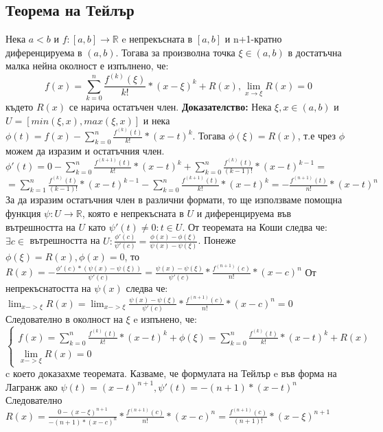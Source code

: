 \documentclass[fleqn,12pt]{article}
\begin{document}
\begin{flushleft}
\subsection{Теорема на Тейлър}
Нека $a<b$ и $f:[a,b]\rightarrow\mathbb{R}$ e непрекъсната в $[a,b]$ и n+1-кратно диференцируема в $(a,b)$. Тогава за произволна точка $\xi \in (a,b)$ в достатъчна малка нейна околност е изпълнено, че:
\[f(x)=\sum_{k = 0}^{n} \frac{f^{(k)}(\xi)}{k!}*(x-\xi)^k + R(x), \lim_{x \rightarrow \xi} R(x) = 0\]
където $R(x)$ се нарича остатъчен член.
\bigbreak
\textbf{Доказателство:}
Нека $\xi,x \in (a,b)$ и $U=[min(\xi,x),max(\xi,x)]$ и нека $\phi(t) = f(x) - \sum_{k = 0}^{n} \frac{f^{(k)}(t)}{k!}*(x-t)^{k}$.
Тогава $\phi(\xi)=R(x)$, т.е чрез $\phi$ можем да изразим и остатъчния член.
\bigbreak
$\phi'(t)=0 - \sum_{k=0}^{n} \frac{f^{(k+1)}(t)}{k!}*(x-t)^{k} +  \sum_{k=0}^{n}\frac{f^{(k)}(t)}{(k-1)!}*(x-t)^{k-1} =$
$=\sum_{k=1}^{n}\frac{f^{(k)}(t)}{(k-1)!}*(x-t)^{k-1} - \sum_{k=0}^{n} \frac{f^{(k+1)}(t)}{k!}*(x-t)^{k} = -\frac{f^{(n+1)}(t)}{n!}*(x-t)^n$
\bigbreak
За да изразим остатъчния член в различни формати, то ще използваме помощна функция $\psi:U\rightarrow\mathbb{R}$, която е непрекъсната в $U$ и диференцируема във вътрешността на $U$ като $\psi'(t) \neq 0 : t \in U$.
От теоремата на Коши следва че: $\exists c \in$ вътрешността на $U: \frac{\phi'(c)}{\psi'(c)}=\frac{\phi(x)-\phi(\xi)}{\psi(x)-\psi(\xi)}$.
\bigbreak
Понеже $\phi(\xi) = R(x), \phi(x) = 0$, то $R(x) = -\frac{\phi'(c)*(\psi(x)-\psi(\xi))}{\psi'(c)} = \frac{\psi(x)-\psi(\xi)}{\psi'(c)}*\frac{f^{(n+1)}(c)}{n!}*(x-c)^n$\newline
От непрекъснатостта на $\psi(x)$ следва че: $\lim_{x->\xi} R(x) = \lim_{x->\xi} \frac{\psi(x)-\psi(\xi)}{\psi'(c)}*\frac{f^{(n+1)}(c)}{n!}*(x-c)^n = 0$
\bigbreak
Следователно в околност на $\xi$ e изпънено, че:
\[
\begin{cases}
    f(x) = \sum_{k = 0}^{n} \frac{f^{(k)}(t)}{k!}*(x-t)^{k} + \phi(\xi) = \sum_{k = 0}^{n} \frac{f^{(k)}(t)}{k!}*(x-t)^{k} + R(x)\\
    \lim_{x->\xi} R(x) = 0
\end{cases}
\]
c което доказахме теоремата. 
\bigbreak
Казваме, че формулата на Тейлър e във форма на Лагранж ако $\psi(t)=(x-t)^{n+1}, \psi'(t)=-(n+1)*(x-t)^n$\\
Следователно $R(x)=\frac{0-(x-\xi)^{n+1}}{-(n+1)*(x-c)^n}*\frac{f^{(n+1)}(c)}{n!}*(x-c)^n = \frac{f^{(n+1)}(c)}{(n+1)!}*(x-\xi)^{n+1}$

\end{flushleft}
\end{document}
